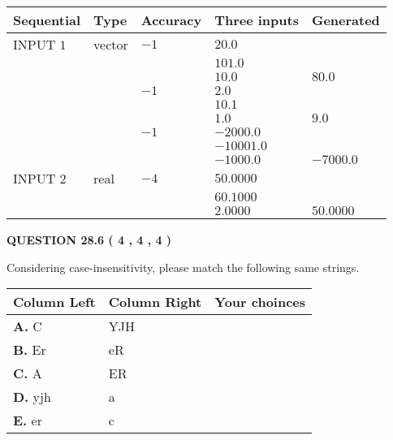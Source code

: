 \documentclass[12pt]{article}
\begin{document}
  
\noindent\begin{tabular}{|l|l|l|l|l|}
\hline
 Sequential & Type & Accuracy & Three inputs & Generated \\ 
\hline
 
 
  INPUT $            1 $ & vector & $           -1  $ & $
20.0
  $ & \\
  & & & $
101.0
  $ & \\
  & & & $
10.0
$ & $ 80.0 $ 
  \\
  & & $           -1  $ & $
2.0
  $ & \\
  & & & $
10.1
  $ & \\
  & & & $
1.0
$ & $ 9.0 $ 
  \\
  & & $           -1  $ & $
-2000.0
  $ & \\
  & & & $
-10001.0
  $ & \\
  & & & $
-1000.0
$ & $ -7000.0 $ 
 \\  \hline  
 
 
  INPUT $            2 $ & real & $           -4  $ & $
 50.0000
  $ & \\
  & & &  $
 60.1000
  $ & \\
  & & &  $
 2.0000
 $ & $ 50.0000 $ 
 \\  \hline  
 \end{tabular}
   
   
  
\vspace{0.2in}
  
{\textbf{\Large{QUESTION
28.6 
 (           4 ,           4 ,           4 )
}}}
  
  
Considering case-insensitivity, please match the following same strings.
  
  
\begin{tabular}{|l|l|l|}
 \hline
 Column Left & Column Right  & Your choinces \\ 
 \hline
{\textbf{\large{
A.}}}
C
  & 
YJH
 & 
 \\ 
 \hline
{\textbf{\large{
B.}}}
Er
  & 
eR
 & 
 \\ 
 \hline
{\textbf{\large{
C.}}}
A
  & 
ER
 & 
 \\ 
 \hline
{\textbf{\large{
D.}}}
yjh
  & 
a
 & 
 \\ 
 \hline
{\textbf{\large{
E.}}}
er
  & 
c
 & 
 \\ 
 \hline
 \end{tabular}
  
  
 
 
\noindent{}
  
\end{document}
